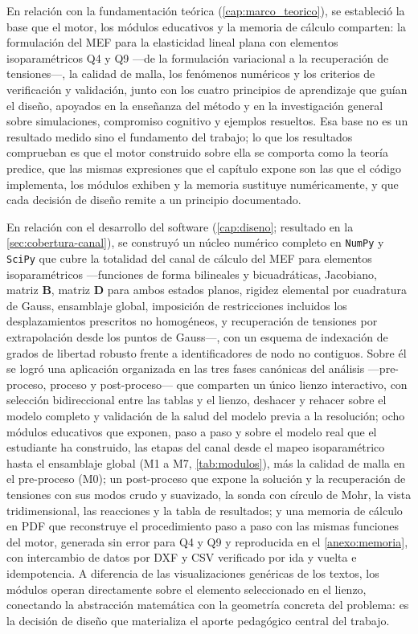 En relación con la fundamentación teórica (\autoref{cap:marco_teorico}), se estableció la base que el motor, los módulos educativos y la memoria de cálculo comparten: la formulación del MEF para la elasticidad lineal plana con elementos isoparamétricos Q4 y Q9 —de la formulación variacional a la recuperación de tensiones—, la calidad de malla, los fenómenos numéricos y los criterios de verificación y validación, junto con los cuatro principios de aprendizaje que guían el diseño, apoyados en la enseñanza del método y en la investigación general sobre simulaciones, compromiso cognitivo y ejemplos resueltos. Esa base no es un resultado medido sino el fundamento del trabajo; lo que los resultados comprueban es que el motor construido sobre ella se comporta como la teoría predice, que las mismas expresiones que el capítulo expone son las que el código implementa, los módulos exhiben y la memoria sustituye numéricamente, y que cada decisión de diseño remite a un principio documentado.

En relación con el desarrollo del software (\autoref{cap:diseno}; resultado en la \autoref{sec:cobertura-canal}), se construyó un núcleo numérico completo en \texttt{NumPy} y \texttt{SciPy} que cubre la totalidad del canal de cálculo del MEF para elementos isoparamétricos —funciones de forma bilineales y bicuadráticas, Jacobiano, matriz $\bm{B}$, matriz $\bm{D}$ para ambos estados planos, rigidez elemental por cuadratura de Gauss, ensamblaje global, imposición de restricciones incluidos los desplazamientos prescritos no homogéneos, y recuperación de tensiones por extrapolación desde los puntos de Gauss—, con un esquema de indexación de grados de libertad robusto frente a identificadores de nodo no contiguos. Sobre él se logró una aplicación organizada en las tres fases canónicas del análisis —pre-proceso, proceso y post-proceso— que comparten un único lienzo interactivo, con selección bidireccional entre las tablas y el lienzo, deshacer y rehacer sobre el modelo completo y validación de la salud del modelo previa a la resolución; ocho módulos educativos que exponen, paso a paso y sobre el modelo real que el estudiante ha construido, las etapas del canal desde el mapeo isoparamétrico hasta el ensamblaje global (M1 a M7, \autoref{tab:modulos}), más la calidad de malla en el pre-proceso (M0); un post-proceso que expone la solución y la recuperación de tensiones con sus modos crudo y suavizado, la sonda con círculo de Mohr, la vista tridimensional, las reacciones y la tabla de resultados; y una memoria de cálculo en PDF que reconstruye el procedimiento paso a paso con las mismas funciones del motor, generada sin error para Q4 y Q9 y reproducida en el \autoref{anexo:memoria}, con intercambio de datos por DXF y CSV verificado por ida y vuelta e idempotencia. A diferencia de las visualizaciones genéricas de los textos, los módulos operan directamente sobre el elemento seleccionado en el lienzo, conectando la abstracción matemática con la geometría concreta del problema: es la decisión de diseño que materializa el aporte pedagógico central del trabajo.


